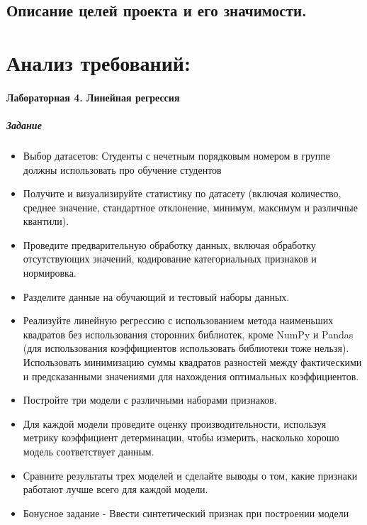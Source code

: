 \documentclass[12pt,onecolumn]{article}
\begin{document}
\subsection{Описание целей проекта и его значимости.}
\section{Анализ требований:}
\paragraph{Лабораторная 4. Линейная регрессия }
\subparagraph{Задание}
\begin{itemize}
  \item Выбор датасетов: Студенты с нечетным порядковым номером в группе должны использовать про обучение студентов
  \item Получите и визуализируйте статистику по датасету (включая количество, среднее значение, стандартное отклонение, минимум, максимум и различные квантили).
  \item Проведите предварительную обработку данных, включая обработку отсутствующих значений, кодирование категориальных признаков и нормировка.
  \item Разделите данные на обучающий и тестовый наборы данных.
  \item Реализуйте линейную регрессию с использованием метода наименьших квадратов без использования сторонних библиотек, кроме NumPy и Pandas (для использования коэффициентов использовать библиотеки тоже нельзя). Использовать минимизацию суммы квадратов разностей между фактическими и предсказанными значениями для нахождения оптимальных коэффициентов.
  \item Постройте три модели с различными наборами признаков.
  \item Для каждой модели проведите оценку производительности, используя метрику коэффициент детерминации, чтобы измерить, насколько хорошо модель соответствует данным.
  \item Сравните результаты трех моделей и сделайте выводы о том, какие признаки работают лучше всего для каждой модели.
  \item Бонусное задание - Ввести синтетический признак при построении модели
\end{itemize}
\end{document}
